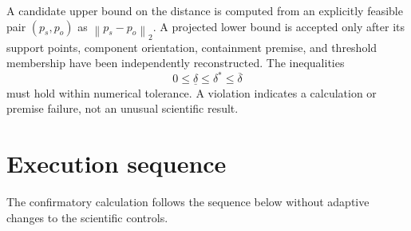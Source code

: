 \documentclass[11pt]{article}
\newcommand{\norm}[1]{\left\lVert #1\right\rVert}
\begin{document}
A candidate upper bound on the distance is computed from an explicitly feasible pair
$(p_s,p_o)$ as $\norm{p_s-p_o}_2$. A projected lower bound is accepted only after its
support points, component orientation, containment premise, and threshold membership
have been independently reconstructed. The inequalities
\[
 0\le\underline\delta\le\delta^*\le\overline\delta
\]
must hold within numerical tolerance. A violation indicates a calculation or premise
failure, not an unusual scientific result.

\section{Execution sequence}

The confirmatory calculation follows the sequence below without adaptive changes to the
scientific controls.
\end{document}
